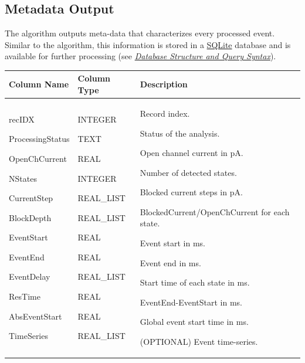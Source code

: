 \documentclass[letterpaper,10pt,english]{sphinxmanual}
\begin{document}
\subsection{Metadata Output}
\label{doc/Algorithms:id6}
The {\hyperref[api\string-doc/mosaic.processing:mosaic.cusumPlus.cusumPlus]{\emph{}}} algorithm outputs meta-data that characterizes every processed event. Similar to the  algorithm, this information is stored in a \href{http://www.sqlite.org/}{SQLite} database and is available for further processing (see {\hyperref[doc/DatabaseStructure:database\string-page]{\emph{Database Structure and Query Syntax}}}).

\begin{tabulary}{\linewidth}{p{4cm}p{4cm}p{8cm}}
\hline
\textsf{\relax 
\textbf{Column Name}
} & \textsf{\relax 
\textbf{Column Type}
} & \textsf{\relax 
\textbf{Description}
}\\
\hline
recIDX

ProcessingStatus

OpenChCurrent

NStates

CurrentStep

BlockDepth

EventStart

EventEnd

EventDelay

ResTime

AbsEventStart

TimeSeries
 & 
INTEGER

TEXT

REAL

INTEGER

REAL\_LIST

REAL\_LIST

REAL

REAL

REAL\_LIST

REAL

REAL

REAL\_LIST
 & 
Record index.

Status of the analysis.

Open channel current in pA.

Number of detected states.

Blocked current steps in pA.

BlockedCurrent/OpenChCurrent for each state.

Event start in ms.

Event end in ms.

Start time of each state in ms.

EventEnd-EventStart in ms.

Global event start time in ms.

(OPTIONAL) Event time-series.
\\
\hline\end{tabulary}
\end{document}
